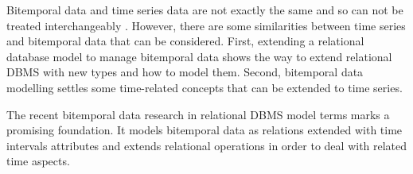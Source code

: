 Bitemporal data and time series data are not exactly the same and so
can not be treated interchangeably \cite{schmidt95}. However, there
are some similarities between time series and bitemporal data that can
be considered. First, extending a relational database model to manage
bitemporal data shows the way to extend relational DBMS with new types
and how to model them. Second, bitemporal data modelling settles some
time-related concepts that can be extended to time series.

The recent bitemporal data research in relational DBMS model terms
\cite{date02:_tempor_data_relat_model} marks a promising
foundation. It models bitemporal data as relations extended with time
intervals attributes and extends relational operations in order to
deal with related time aspects.











